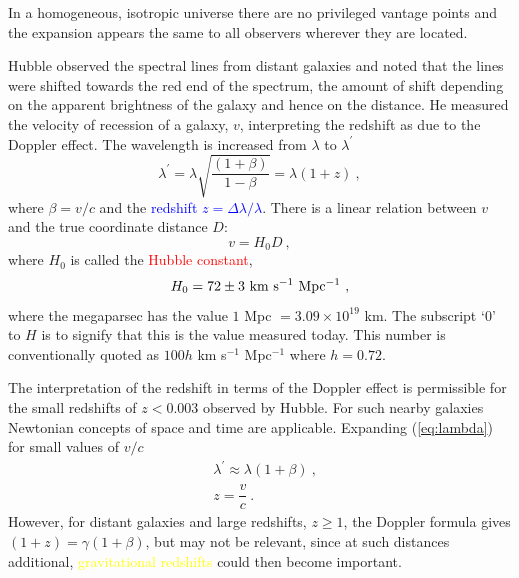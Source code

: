 \documentclass[12pt,a4paper]{article}
\begin{document}
In a homogeneous, isotropic universe there are no privileged vantage points and the expansion appears the same to all observers wherever they are located. 


\cite{perkins2008particle} Hubble observed the spectral lines from distant galaxies and noted that the lines were shifted towards the red end of the spectrum, the amount of shift depending on the apparent brightness of the galaxy and hence on the distance. He measured the velocity of recession of a galaxy, $v$, interpreting the redshift as due to the Doppler effect. The wavelength is increased from $\lambda$ to $\lambda^\prime$
\begin{equation}
\lambda^\prime = \lambda \sqrt{\dfrac{(1+\beta)}{1-\beta} } = \lambda (1+z) ~,
\label{eq:lambda}
\end{equation}
where $\beta = v/c$ and the \textcolor{blue}{redshift $z = \Delta \lambda/\lambda$}. There is a linear relation between $v$ and the true coordinate distance $D$:
\begin{equation}
v = H_0 D ~,
\end{equation}
where $H_0$ is called the \textcolor{red}{Hubble constant},
\begin{equation}
H_0 = 72 \pm 3 ~{\rm km ~s^{-1} ~Mpc^{-1} } ~,
\end{equation}
where the megaparsec has the value $1$ Mpc $= 3.09 \times 10^{19}$ km. The subscript `$0$' to $H$ is to signify that this is the value measured today. This number is conventionally quoted as $100 h$ km s$^{-1}$ Mpc$^{-1}$ where $h = 0.72$. 

The interpretation of the redshift in terms of the Doppler effect is permissible for the small redshifts of $z < 0.003$ observed by Hubble. For such nearby galaxies Newtonian concepts of space and time are applicable. Expanding (\ref{eq:lambda}) for small values of $v/c$
\begin{align*}
& \lambda^\prime  \approx \lambda (1+\beta) ~, \\
& z = \dfrac{v}{c} ~.
\end{align*}
However, for distant galaxies and large redshifts, $z \geqslant 1$, the Doppler formula gives $(1 + z) = \gamma (1 + \beta)$, but may not be relevant, since at such distances additional, \textcolor{yellow}{gravitational redshifts} could then become important.
\end{document}
